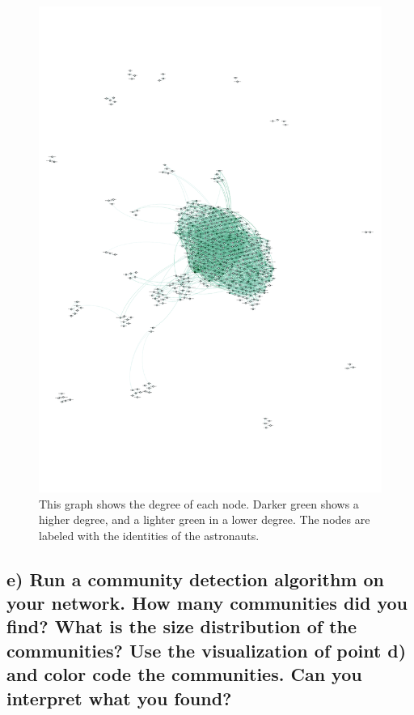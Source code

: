 \documentclass{tufte-handout}
\begin{document}
\begin{figure}
  \includegraphics{degree.pdf}
  \caption{This graph shows the degree of each node. Darker green shows a higher degree, and a lighter green in a lower degree. The nodes are labeled with the identities of the astronauts.
  }
  \label{fig:textfig}
\end{figure}


\clearpage
\subsection{e) Run a community detection algorithm on your network. How many communities did you find? What is the size distribution of the communities? Use the visualization of point d) and color code the communities. Can you interpret what you found?}
\end{document}
